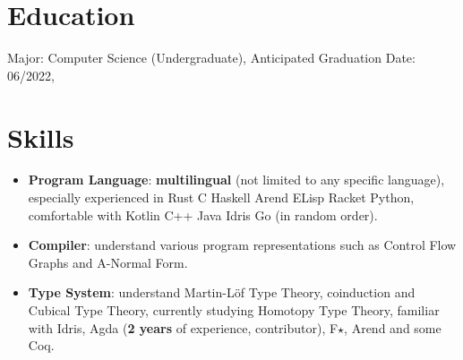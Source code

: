 \documentclass{resume}
\begin{document}
\section{Education}
Major: Computer Science (Undergraduate), Anticipated Graduation Date: 06/2022, 
\section{Skills}
\begin{itemize}[parsep=0.25ex]
\item
\textbf{Program Language}:
\textbf{multilingual} (not limited to any specific language),
especially experienced in Rust C Haskell Arend ELisp Racket Python,
comfortable with Kotlin C++ Java Idris Go (in random order).
\item
\textbf{Compiler}:
understand various program representations such as
Control Flow Graphs and A-Normal Form.
\item
\textbf{Type System}:
understand Martin-L\"{o}f Type Theory, coinduction and Cubical Type Theory,
currently studying Homotopy Type Theory,
familiar with Idris, Agda (\textbf{2 years} of experience, contributor),
F$\star$, Arend and some Coq.
\end{itemize}
\end{document}
